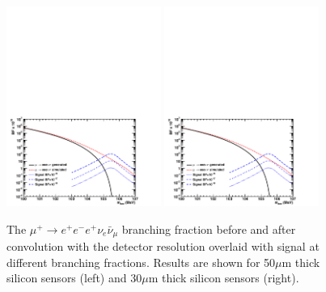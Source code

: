 \begin{figure}[htb]
\begin{center}
\includegraphics[width=0.45\textwidth]{Figures/mu3e-irr.pdf}
\includegraphics[width=0.45\textwidth]{Figures/mu3e-irr.pdf}
\end{center}
\caption{The $\mu^+ \rightarrow e^+e^-e^+\nu_e \bar\nu_\mu$ branching fraction before and after convolution with the detector resolution overlaid with signal at different branching 
fractions. Results are shown for 50$\mu$m thick silicon sensors (left) and 30$\mu$m thick silicon sensors (right).}
\label{Fig::mu3e2}
\end{figure}

